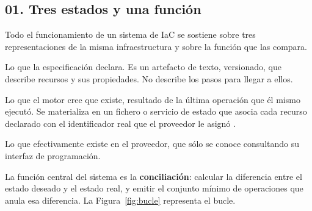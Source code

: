 \documentclass[11pt,letterpaper]{article}
\begin{document}
\subsection*{01. Tres estados y una función}

Todo el funcionamiento de un sistema de IaC se sostiene sobre tres
representaciones de la misma infraestructura y sobre la función que las
compara.

\begin{description}[style=nextline, leftmargin=0pt, labelwidth=0pt, labelsep=0pt]
  \item[Estado deseado.] Lo que la especificación declara. Es un artefacto de
    texto, versionado, que describe recursos y sus propiedades. No describe
    los pasos para llegar a ellos.
  \item[Estado registrado.] Lo que el motor cree que existe, resultado de la
    última operación que él mismo ejecutó. Se materializa en un fichero o
    servicio de estado que asocia cada recurso declarado con el identificador
    real que el proveedor le asignó \parencite{terraformstate}.
  \item[Estado real.] Lo que efectivamente existe en el proveedor, que sólo se
    conoce consultando su interfaz de programación.
\end{description}

La función central del sistema es la \textbf{conciliación}: calcular la
diferencia entre el estado deseado y el estado real, y emitir el conjunto
mínimo de operaciones que anula esa diferencia. La Figura~\ref{fig:bucle}
representa el bucle.
\end{document}
